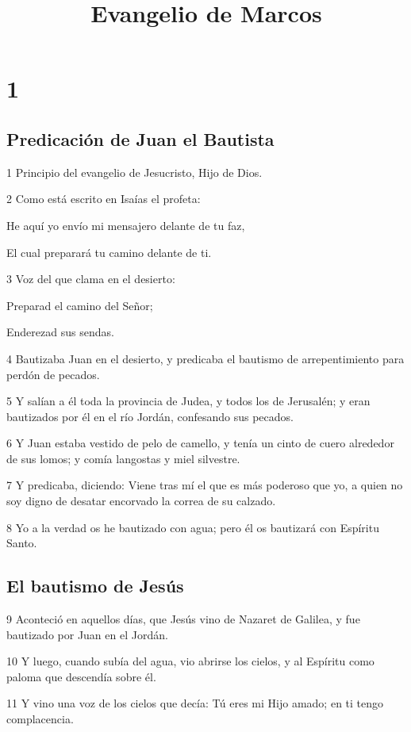 
\title{Evangelio de Marcos}

\chapter{1}

\section*{Predicación de Juan el Bautista}

\par 1 Principio del evangelio de Jesucristo, Hijo de Dios.
\par 2 Como está escrito en Isaías el profeta:
\par He aquí yo envío mi mensajero delante de tu faz,
\par El cual preparará tu camino delante de ti.
\par 3 Voz del que clama en el desierto:
\par Preparad el camino del Señor;
\par Enderezad sus sendas.
\par 4 Bautizaba Juan en el desierto, y predicaba el bautismo de arrepentimiento para perdón de pecados.
\par 5 Y salían a él toda la provincia de Judea, y todos los de Jerusalén; y eran bautizados por él en el río Jordán, confesando sus pecados.
\par 6 Y Juan estaba vestido de pelo de camello, y tenía un cinto de cuero alrededor de sus lomos; y comía langostas y miel silvestre.
\par 7 Y predicaba, diciendo: Viene tras mí el que es más poderoso que yo, a quien no soy digno de desatar encorvado la correa de su calzado.
\par 8 Yo a la verdad os he bautizado con agua; pero él os bautizará con Espíritu Santo.

\section*{El bautismo de Jesús}

\par 9 Aconteció en aquellos días, que Jesús vino de Nazaret de Galilea, y fue bautizado por Juan en el Jordán.
\par 10 Y luego, cuando subía del agua, vio abrirse los cielos, y al Espíritu como paloma que descendía sobre él.
\par 11 Y vino una voz de los cielos que decía: Tú eres mi Hijo amado; en ti tengo complacencia.

